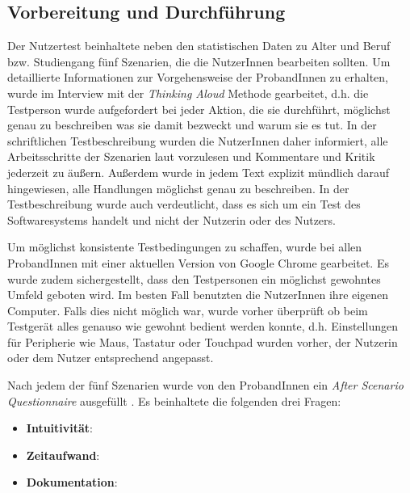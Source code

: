 \subsection{Vorbereitung und Durchführung}

Der Nutzertest beinhaltete neben den statistischen Daten zu Alter und Beruf bzw. Studiengang fünf Szenarien, die die NutzerInnen bearbeiten sollten. Um detaillierte Informationen zur Vorgehensweise der ProbandInnen zu erhalten, wurde im Interview mit der \textit{Thinking Aloud} Methode gearbeitet, d.h. die Testperson wurde aufgefordert bei jeder Aktion, die sie durchführt, möglichst genau zu beschreiben was sie damit bezweckt und warum sie es tut.  In der schriftlichen Testbeschreibung wurden die NutzerInnen daher informiert, alle Arbeitsschritte der Szenarien laut vorzulesen und Kommentare und Kritik jederzeit zu äußern. Außerdem wurde in jedem Text explizit mündlich darauf hingewiesen, alle Handlungen möglichst genau zu beschreiben. In der Testbeschreibung wurde auch verdeutlicht, dass es sich um ein Test des Softwaresystems handelt und nicht der Nutzerin oder des Nutzers.

Um möglichst konsistente Testbedingungen zu schaffen, wurde bei allen ProbandInnen mit einer aktuellen Version von Google Chrome gearbeitet. Es wurde zudem sichergestellt, dass den Testpersonen ein möglichst gewohntes Umfeld geboten wird. Im besten Fall benutzten die NutzerInnen ihre eigenen Computer. Falls dies nicht möglich war, wurde vorher überprüft ob beim Testgerät alles genauso wie gewohnt bedient werden konnte, d.h. Einstellungen für Peripherie wie Maus, Tastatur oder Touchpad wurden vorher, der Nutzerin oder dem Nutzer entsprechend angepasst.

Nach jedem der fünf Szenarien wurde von den ProbandInnen ein \textit{After Scenario Questionnaire} ausgefüllt . Es beinhaltete die folgenden drei Fragen:
\begin{itemize}
	\item \textbf{Intuitivität}: 
	\item \textbf{Zeitaufwand}: 
	\item \textbf{Dokumentation}: 
\end{itemize}

